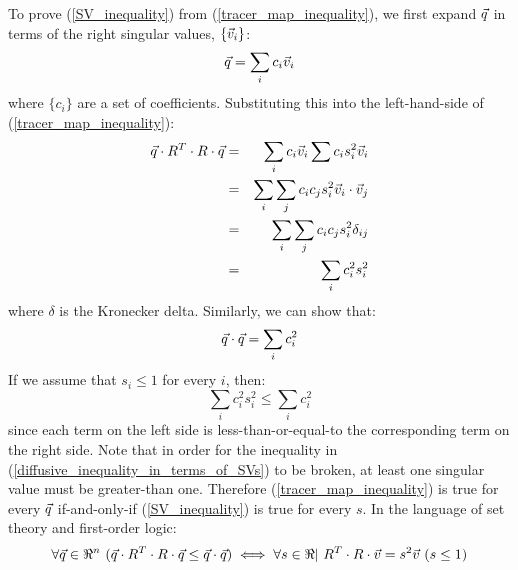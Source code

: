 \documentclass{article}
\begin{document}
To prove (\ref{SV_inequality}) from (\ref{tracer_map_inequality}), we first
expand $\vec q$ in terms of the right singular values, 
$\lbrace \vec v_i \rbrace$:
\begin{equation}
	\vec q = \sum_i c_i \vec v_i
\end{equation}
where $\lbrace c_i \rbrace$ are a set of coefficients.
Substituting this into the left-hand-side of (\ref{tracer_map_inequality}):
\begin{eqnarray}
	\vec q \cdot R^T \cdot R \cdot \vec q & = & \sum_i c_i \vec v_i \sum c_i s_i^2 \vec v_i \\
   & = & \sum_i \sum_j c_i c_j s_i^2 \vec v_i \cdot \vec v_j \\
   & = & \sum_i \sum_j c_i c_j s_i^2 \delta_{ij} \\
	  & = & \sum_i c_i^2 s_i^2
\end{eqnarray}
where $\delta$ is the Kronecker delta.
Similarly, we can show that:
\begin{equation}
	\vec q \cdot \vec q = \sum_i c_i^2
\end{equation}
If we assume that $s_i \le 1$ for every $i$, then:
\begin{equation}
	\sum_i c_i^2 s_i^2 \le \sum_i c_i^2 
	\label{diffusive_inequality_in_terms_of_SVs}
\end{equation}
since each term on the left side is less-than-or-equal-to the
corresponding term on the right side. 
Note that in order for the inequality in 
(\ref{diffusive_inequality_in_terms_of_SVs}) to be broken, at least one
singular value must be greater-than one.
Therefore (\ref{tracer_map_inequality}) is true for every $\vec q$
if-and-only-if (\ref{SV_inequality}) is true for every $s$.
In the language of set theory and first-order logic:
\begin{equation}
	\forall \vec q \in \Re^n ~ (\vec q \cdot R^T \cdot R \cdot \vec q \le \vec q \cdot \vec q) \iff \forall s \in \Re | ~R^T \cdot R \cdot \vec v = s^2 \vec v ~ (s \le 1)
\end{equation}


\end{document}
